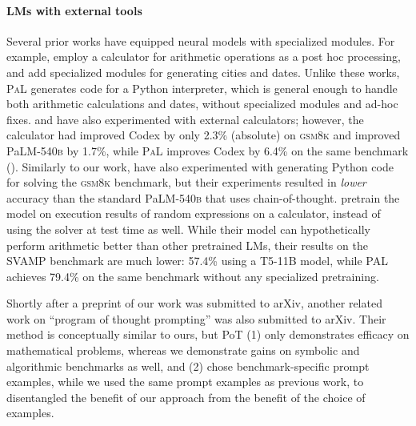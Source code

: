 \documentclass[dvipsnames]{article} \usepackage[accepted]{icml2022}
\newcommand{\ours}{\textsc{PaL}\xspace}
\newcommand{\gsm}{\textsc{gsm8k}\xspace}
\newcommand{\largepalm}{\textsc{P}a\textsc{LM}\textsc{-540b}\xspace}
\begin{document}
\paragraph{LMs with external tools}
Several prior works have equipped neural models with specialized modules. For example, \citet{cobbe2021training} employ a calculator for arithmetic operations as a post hoc processing, and \citet{demeter2020just_add_functions} add specialized modules for generating cities and dates.
Unlike these works, \ours generates code for a Python interpreter, which is general enough to handle both arithmetic calculations and dates, without specialized modules and ad-hoc fixes.
\citet{palm:arxiv} and \citet{wei2022chain} have also experimented with external calculators; however, the  calculator had improved Codex by only 2.3\% (absolute) on \gsm and improved \largepalm by 1.7\%, while \ours improves Codex by 6.4\% on the same benchmark ().
Similarly to our work, \citet{palm:arxiv} have also experimented with generating Python code for solving the \gsm benchmark, but their experiments resulted in \emph{lower} accuracy than the standard \largepalm that uses chain-of-thought. 
\citet{pi2022reasoning} pretrain the model on execution results of random expressions on a calculator, 
instead
of using the solver at test time as well. While their model can hypothetically perform arithmetic better than other pretrained LMs, their results on the SVAMP benchmark are much lower: 57.4\% using a T5-11B model, while PAL achieves 79.4\% on the same benchmark without any specialized pretraining.

Shortly after a preprint of our work was submitted to arXiv, another related work on ``program of thought prompting'' \cite{chen2022program} was also submitted to arXiv. Their method is conceptually similar to ours, but PoT (1) only demonstrates efficacy on mathematical problems, whereas we demonstrate gains on symbolic and algorithmic benchmarks as well, and (2) chose benchmark-specific prompt examples, while we used the same prompt examples as previous work, to disentangled the benefit of our approach from the benefit of the choice of examples.
\end{document}
